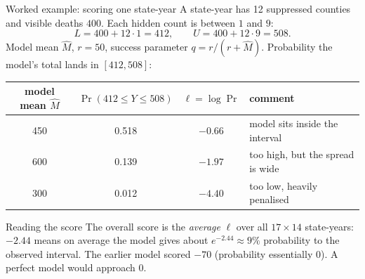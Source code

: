 ﻿\documentclass[9pt,aspectratio=169]{beamer}
\begin{document}
\begin{frame}{Worked example: scoring one state-year}
 A state-year has 12 suppressed counties and visible deaths $400$. Each hidden count is between $1$ and $9$:
 \[ L=400+12\cdot1=412,\qquad U=400+12\cdot9=508. \]
 Model mean $\widehat M$, $r=50$, success parameter $q=r/(r+\widehat M)$. Probability the model's total lands in $[412,508]$:
 \par\smallskip
 \centering\small\renewcommand{\arraystretch}{1.2}
 \begin{tabular}{c c c l}
 \toprule model mean $\widehat M$ & $\Pr(412\le Y\le508)$ & $\ell=\log\Pr$ & comment\\\midrule
 450 & 0.518 & $-0.66$ & model sits inside the interval\\
 600 & 0.139 & $-1.97$ & too high, but the spread is wide\\
 300 & 0.012 & $-4.40$ & too low, heavily penalised\\\bottomrule
 \end{tabular}
 \par\smallskip\raggedright
 \begin{block}{Reading the score}\small
  The overall score is the \emph{average} $\ell$ over all $17\times14$ state-years: $-2.44$ means on average the model gives about $e^{-2.44}\approx9\%$ probability to the observed interval. The earlier model scored $-70$ (probability essentially $0$). A perfect model would approach $0$.
 \end{block}
\end{frame}
\end{document}
